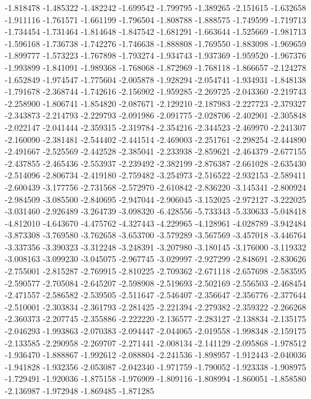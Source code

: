 -1.818478
-1.485322
-1.482242
-1.699542
-1.799795
-1.389265
-2.151615
-1.632658
-1.911116
-1.761571
-1.661199
-1.796504
-1.808788
-1.888575
-1.749599
-1.719713
-1.734454
-1.731464
-1.814648
-1.847542
-1.681291
-1.663644
-1.525669
-1.981713
-1.596168
-1.736738
-1.742276
-1.746638
-1.888808
-1.769550
-1.883098
-1.969659
-1.899777
-1.573223
-1.767898
-1.793274
-1.934743
-1.937369
-1.959520
-1.967376
-1.993899
-1.841091
-1.989368
-1.768068
-1.872969
-1.768118
-1.866657
-2.124278
-1.652849
-1.974547
-1.775604
-2.005878
-1.928294
-2.054741
-1.934931
-1.848138
-1.791678
-2.368744
-1.742616
-2.156902
-1.959285
-2.269725
-2.043360
-2.219743
-2.258900
-1.806741
-1.854820
-2.087671
-2.129210
-2.187983
-2.227723
-2.379327
-2.343873
-2.214793
-2.229793
-2.091986
-2.091775
-2.028706
-2.402901
-2.305848
-2.022147
-2.041444
-2.359315
-2.319784
-2.354216
-2.344523
-2.469970
-2.241307
-2.160090
-2.381481
-2.544402
-2.441514
-2.469003
-2.251761
-2.298254
-2.444890
-2.491667
-2.525569
-2.442528
-2.385041
-2.233938
-2.859621
-2.464379
-2.677155
-2.437855
-2.465436
-2.553937
-2.239492
-2.382199
-2.876387
-2.661028
-2.635430
-2.514096
-2.806734
-2.419180
-2.759482
-3.254973
-2.516522
-2.932153
-2.589411
-2.600439
-3.177756
-2.731568
-2.572970
-2.610842
-2.836220
-3.145341
-2.800924
-2.984509
-3.085500
-2.840695
-2.947044
-2.906045
-3.152025
-2.972127
-3.222025
-3.031460
-2.926489
-3.264739
-3.098320
-6.428556
-5.733343
-5.330633
-5.048418
-4.812010
-4.643670
-4.475762
-4.327443
-4.229965
-4.128961
-4.028789
-3.942484
-3.873308
-3.769580
-3.762658
-3.653700
-3.579289
-3.567569
-3.457018
-3.446764
-3.337356
-3.390323
-3.312248
-3.248391
-3.207980
-3.180145
-3.176000
-3.119332
-3.008163
-3.099230
-3.045075
-2.967745
-3.029997
-2.927299
-2.848691
-2.830626
-2.755001
-2.815287
-2.769915
-2.810225
-2.709362
-2.671118
-2.657698
-2.583595
-2.590577
-2.705084
-2.645207
-2.598908
-2.519693
-2.502169
-2.556503
-2.468454
-2.471557
-2.586582
-2.539505
-2.511647
-2.546407
-2.356647
-2.356776
-2.377644
-2.510001
-2.303834
-2.361793
-2.281425
-2.221394
-2.279382
-2.359322
-2.266268
-2.360373
-2.207745
-2.355886
-2.222220
-2.136577
-2.283127
-2.138834
-2.135175
-2.046293
-1.993863
-2.070383
-2.094447
-2.044065
-2.019558
-1.998348
-2.159175
-2.133585
-2.290958
-2.269707
-2.271441
-2.008134
-2.141129
-2.095868
-1.978512
-1.936470
-1.888867
-1.992612
-2.088804
-2.241536
-1.898957
-1.912443
-2.040036
-1.941828
-1.932356
-2.053087
-2.042340
-1.971759
-1.790052
-1.923338
-1.908975
-1.729491
-1.920036
-1.875158
-1.976909
-1.809116
-1.808994
-1.860051
-1.858580
-2.136987
-1.972948
-1.869485
-1.871285
